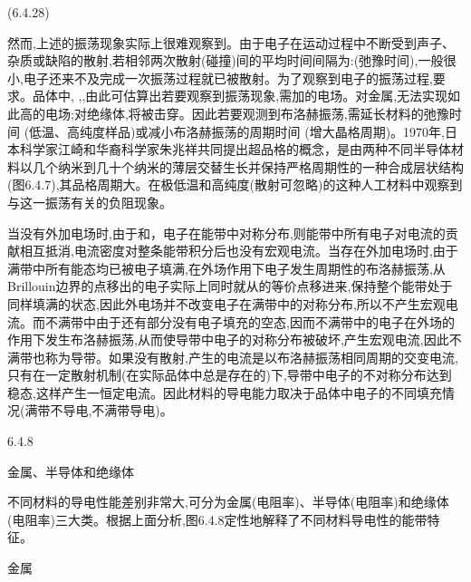  	(6.4.28)



然而,上述的振荡现象实际上很难观察到。由于电子在运动过程中不断受到声子、杂质或缺陷的散射,若相邻两次散射(碰撞)间的平均时间间隔为:(弛豫时间),一般很小,电子还来不及完成一次振荡过程就已被散射。为了观察到电子的振荡过程,要求。品体中, ,,由此可估算出若要观察到振荡现象,需加的电场。对金属,无法实现如此高的电场;对绝缘体,将被击穿。因此若要观测到布洛赫振荡,需延长材料的弛豫时间 (低温、高纯度样品)或减小布洛赫振荡的周期时间 (增大晶格周期)。1970年,日本科学家江崎和华裔科学家朱兆祥共同提出超品格的概念，是由两种不同半导体材料以几个纳米到几十个纳米的薄层交替生长并保持严格周期性的一种合成层状结构(图6.4.7),其品格周期大。在极低温和高纯度(散射可忽略)的这种人工材料中观察到与这一振荡有关的负阻现象。

当没有外加电场时,由于和，电子在能带中对称分布,则能带中所有电子对电流的贡献相互抵消,电流密度对整条能带积分后也没有宏观电流。当存在外加电场时,由于满带中所有能态均已被电子填满,在外场作用下电子发生周期性的布洛赫振荡,从Brillouin边界的点移出的电子实际上同时就从的等价点移进来,保持整个能带处于同样填满的状态,因此外电场并不改变电子在满带中的对称分布,所以不产生宏观电流。而不满带中由于还有部分没有电子填充的空态,因而不满带中的电子在外场的作用下发生布洛赫振荡,从而使导带中电子的对称分布被破坏,产生宏观电流,因此不满带也称为导带。如果没有散射,产生的电流是以布洛赫振荡相同周期的交变电流,只有在一定散射机制(在实际品体中总是存在的)下,导带中电子的不对称分布达到稳态,这样产生一恒定电流。因此材料的导电能力取决于品体中电子的不同填充情况(满带不导电,不满带导电)。

6.4.8

金属、半导体和绝缘体

不同材料的导电性能差别非常大,可分为金属(电阻率)、半导体(电阻率)和绝缘体(电阻率)三大类。根据上面分析,图6.4.8定性地解释了不同材料导电性的能带特征。



金属

